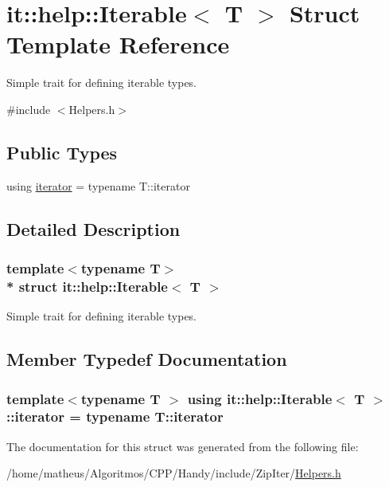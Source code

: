 \hypertarget{structit_1_1help_1_1Iterable}{}\section{it\+:\+:help\+:\+:Iterable$<$ T $>$ Struct Template Reference}
\label{structit_1_1help_1_1Iterable}


Simple trait for defining iterable types.  




{\ttfamily \#include $<$Helpers.\+h$>$}

\subsection*{Public Types}
\begin{DoxyCompactItemize}
\item 
using \hyperlink{structit_1_1help_1_1Iterable_ae119f8a540d8b116afb5a0153c6f6c8a}{iterator} = typename T\+::iterator
\end{DoxyCompactItemize}


\subsection{Detailed Description}
\subsubsection*{template$<$typename T$>$\\*
struct it\+::help\+::\+Iterable$<$ T $>$}

Simple trait for defining iterable types. 

\subsection{Member Typedef Documentation}
\subsubsection[{\texorpdfstring{iterator}{iterator}}]{\setlength{\rightskip}{0pt plus 5cm}template$<$typename T $>$ using {\bf it\+::help\+::\+Iterable}$<$ T $>$\+::{\bf iterator} =  typename T\+::iterator}\hypertarget{structit_1_1help_1_1Iterable_ae119f8a540d8b116afb5a0153c6f6c8a}{}\label{structit_1_1help_1_1Iterable_ae119f8a540d8b116afb5a0153c6f6c8a}


The documentation for this struct was generated from the following file\+:\begin{DoxyCompactItemize}
\item 
/home/matheus/\+Algoritmos/\+C\+P\+P/\+Handy/include/\+Zip\+Iter/\hyperlink{ZipIter_2Helpers_8h}{Helpers.\+h}\end{DoxyCompactItemize}
